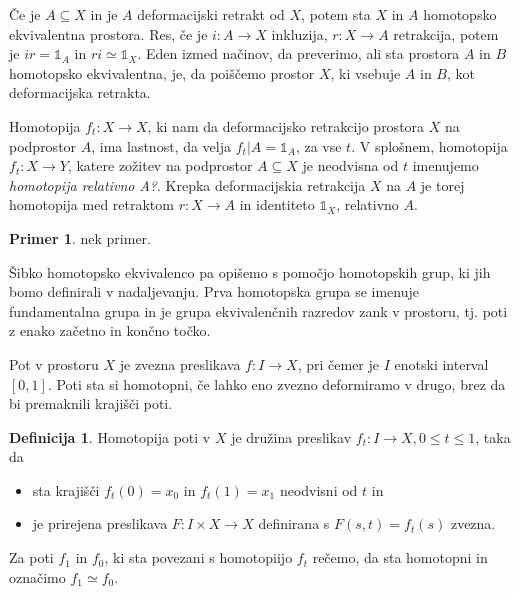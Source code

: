 \documentclass[a4paper,12pt]{article}
\theoremstyle{definition}
\newtheorem{definicija}{Definicija}
\theoremstyle{plain}
\theoremstyle{definition}
\newtheorem{primer}{Primer}
\theoremstyle{plain}
\theoremstyle{plain}
\theoremstyle{plain}
\theoremstyle{plain}
\begin{document}
Če je $A\subseteq X$ in je $A$ deformacijski retrakt od $X$, potem sta 
$X$ in $A$ homotopsko ekvivalentna prostora. Res, če je $i:A\rightarrow
 X$ inkluzija, $r:X\rightarrow A$ retrakcija, potem je $ir=\mathds{1}_A$
  in $ri\simeq\mathds{1}_X$. Eden izmed načinov, da preverimo, ali sta
   prostora $A$ in $B$ homotopsko ekvivalentna, je, da poiščemo prostor
    $X$, ki vsebuje $A$ in $B$, kot deformacijska retrakta. 

Homotopija $f_t: X\rightarrow X$, ki nam da deformacijsko retrakcijo 
prostora $X$ na podprostor $A$, ima lastnost, da velja 
$f_t|A=\mathds{1}_A$, za vse $t$. V splošnem, homotopija 
$f_t:X\rightarrow Y$, katere zožitev na podprostor $A\subseteq X$ je 
neodvisna od $t$ imenujemo \textit{homotopija relativno A?}. Krepka 
deformacijskia retrakcija $X$ na $A$ je torej homotopija med retraktom
 $r:X\rightarrow A$ in identiteto $\mathds{1}_X$, relativno $A$.


\begin{primer}
    nek primer.
\end{primer}

Šibko homotopsko ekvivalenco pa opišemo s pomočjo homotopskih grup, ki
 jih bomo definirali v nadaljevanju. Prva homotopska grupa se imenuje
  fundamentalna grupa in je grupa ekvivalenčnih razredov zank v prostoru, 
 tj. poti z enako začetno in končno točko.

Pot v prostoru $X$ je zvezna preslikava $ f: I \rightarrow X$, pri čemer je $I$ enotski interval $[0,1]$. Poti sta si homotopni, če lahko eno zvezno deformiramo v drugo, brez da bi premaknili krajišči poti.
\begin{definicija}
    
    Homotopija poti v $X$ je družina preslikav $f_t:I \rightarrow X, 0\le t \le 1$, taka da
    \begin{itemize}
        \item 
        sta krajišči $f_t(0) = x_0$ in $f_t(1) = x_1$ neodvisni od $t$ in
        \item 
        je prirejena preslikava $F:I\times X \rightarrow X$ definirana s $F(s,t) = f_t(s)$ zvezna.
    \end{itemize}
    Za poti $f_1$ in $f_0$, ki sta povezani s homotopiijo $f_t$ rečemo, da sta homotopni in označimo $f_1 \simeq f_0$.
\end{definicija}
\end{document}
